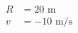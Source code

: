 \documentclass[preview]{standalone}
\begin{document}
\begin{align*}
R &= 20 \text{ m} \\ v &= -10 \text{ m/s}
\end{align*}
\end{document}
